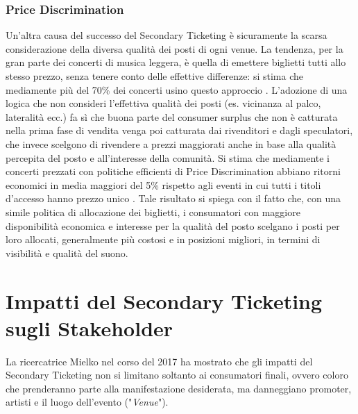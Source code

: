 \subsubsection{Price Discrimination}
Un'altra causa del successo del Secondary Ticketing è sicuramente la scarsa considerazione della diversa qualità dei posti di ogni venue. La tendenza, per la gran parte dei concerti di musica leggera, è quella di emettere biglietti tutti allo stesso prezzo, senza tenere conto delle effettive differenze: si stima che mediamente più del 70\% dei concerti usino questo approccio \cite{leslie2013resale, esteves2009price}. L'adozione di una logica che non consideri l'effettiva qualità dei posti (es. vicinanza al palco, lateralità ecc.) fa sì che buona parte del consumer surplus che non è catturata nella prima fase di vendita venga poi catturata dai rivenditori e dagli speculatori, che invece scelgono di rivendere a prezzi maggiorati anche in base alla qualità percepita del posto e all'interesse della comunità. 
Si stima che mediamente i concerti prezzati con politiche efficienti di Price Discrimination abbiano ritorni economici in media maggiori del 5\% rispetto agli eventi in cui tutti i titoli d'accesso hanno prezzo unico \cite{courty2012impact}. Tale risultato si spiega con il fatto che, con una simile politica di allocazione dei biglietti, i consumatori con maggiore disponibilità economica e interesse per la qualità del posto scelgano i posti per loro allocati, generalmente più costosi e in posizioni migliori, in termini di visibilità e qualità del suono. %

\section{Impatti del Secondary Ticketing sugli Stakeholder}
La ricercatrice Mielko \cite{phdthesis} nel corso del 2017 ha mostrato che gli impatti del Secondary Ticketing non si limitano soltanto ai consumatori finali, ovvero coloro che prenderanno parte alla manifestazione desiderata, ma danneggiano promoter, artisti e il luogo dell'evento ("\textit{Venue}").
